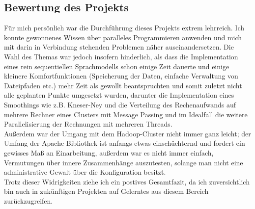 \documentclass[a4paper,12pt]{scrartcl}
\begin{document}
    \subsection{Bewertung des Projekts}

    Für mich persönlich war die Durchführung dieses Projekts extrem lehrreich. Ich konnte gewonnenes Wissen über paralleles Programmieren anwenden und mich mit darin in Verbindung stehenden Problemen näher auseinandersetzen. Die Wahl des Themas war jedoch insofern hinderlich, als dass die Implementation eines rein sequentiellen Sprachmodells schon einige Zeit dauerte und einige kleinere Komfortfunktionen (Speicherung der Daten, einfache Verwaltung von Dateipfaden etc.) mehr Zeit als gewollt beantspruchten und somit zuletzt nicht alle geplanten Punkte umgesetzt wurden, darunter die Implementation eines Smoothings wie z.B. Kneser-Ney und die Verteilung des Rechenaufwands auf mehrere Rechner eines Clusters mit Message Passing und im Idealfall die weitere Parallelisierung der Rechnungen mit mehreren Threads. \\
    Außerdem war der Umgang mit dem Hadoop-Cluster nicht immer ganz leicht; der Umfang der Apache-Bibliothek ist anfangs etwas einschüchternd und fordert ein gewisses Maß an Einarbeitung, außerdem war es nicht immer einfach, Vermutungen über innere Zusammenhänge auszutesten, solange man nicht eine administrative Gewalt über die Konfiguration besitzt.\\

    Trotz dieser Widrigkeiten ziehe ich ein postives Gesamtfazit, da ich zuversichtlich bin auch in zukünftigen Projekten auf Gelerntes aus diesem Bereich zurückzugreifen.



\clearpage

\onehalfspacing

\pagestyle{plain}


\clearpage
\nocite{*}
{}

\end{document}
